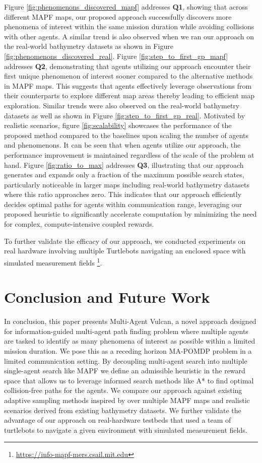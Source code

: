 \documentclass[letterpaper, 10 pt, conference]{IEEEConference}
\begin{document}
Figure \ref{fig:phenomenons_discovered_mapf} addresses \textbf{Q1}, showing that across different MAPF maps, our proposed approach successfully discovers more phenomena of interest within the same mission duration while avoiding collisions with other agents. A similar trend is also observed when we ran our approach on the real-world bathymetry datasets as shown in Figure \ref{fig:phenomenons_discovered_real}. Figure \ref{fig:step_to_first_gp_mapf} addresses \textbf{Q2}, demonstrating that agents utilizing our approach encounter their first unique phenomenon of interest sooner compared to the alternative methods in MAPF maps. This suggests that agents effectively leverage observations from their counterparts to explore different map areas thereby leading to efficient map exploration. Similar trends were also observed on the real-world bathymetry datasets as well as shown in Figure \ref{fig:step_to_first_gp_real}. Motivated by realistic scenarios, figure \ref{fig:scalability} showcases the performance of the proposed method compared to the baselines upon scaling the number of agents and phenomenons. It can be seen that when agents utilize our approach, the performance improvement is maintained regardless of the scale of the problem at hand. Figure \ref{fig:ratio_to_max} addresses \textbf{Q3}, illustrating that our approach generates and expands only a fraction of the maximum possible search states, particularly noticeable in larger maps including real-world bathymetry datasets where this ratio approaches zero. This indicates that our approach efficiently decides optimal paths for agents within communication range, leveraging our proposed heuristic to significantly accelerate computation by minimizing the need for complex, compute-intensive coupled rewards. 

To further validate the efficacy of our approach, we conducted experiments on real hardware involving multiple Turtlebots navigating an enclosed space with simulated measurement fields \footnote{\url{https://info-mapf-mers.csail.mit.edu}}.

\section{Conclusion and Future Work}

In conclusion, this paper presents Multi-Agent Vulcan, a novel approach designed for information-guided multi-agent path finding problem where multiple agents are tasked to identify as many phenomena of interest as possible within a limited mission duration. We pose this as a receding horizon MA-POMDP problem in a limited communication setting. By decoupling multi-agent search into multiple single-agent search like MAPF we define an admissible heuristic in the reward space that allows us to leverage informed search methods like A* to find optimal collision-free paths for the agents. We compare our approach against existing adaptive sampling methods inspired by \cite{ayton2017} over multiple MAPF maps and realistic scenarios derived from existing bathymetry datasets. We further validate the advantage of our approach on real-hardware testbeds that used a team of turtlebots to navigate a given environment with simulated measurement fields.
\end{document}
